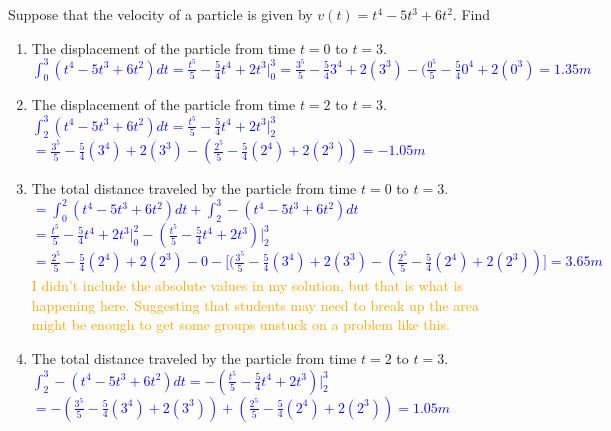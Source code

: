 \documentclass{ximera}
\begin{document}
\begin{exercise}
    Suppose that the velocity of a particle is given by $v(t)=t^4-5t^3+6t^2$.  Find 
    \begin{enumerate}
        \item The displacement of the particle from time $t=0$ to $t=3$.\\
        \textcolor{blue}{ $\int_0^3 (t^4-5t^3+6t^2)dt=\frac{t^5}{5}-\frac{5}{4}t^4+2t^3\bigg|_{0}^{3}=\frac{3^5}{5}-\frac{5}{4}3^4+2(3^3)-(\frac{0^5}{5}-\frac{5}{4}0^4+2(0^3)=1.35 m$}
        
        \item The displacement of the particle from time $t=2$ to $t=3$.\\
        \textcolor{blue}{ $\int_2^3 (t^4-5t^3+6t^2)dt=\frac{t^5}{5}-\frac{5}{4}t^4+2t^3\bigg|_{2}^{3}$\\
        $=\frac{3^5}{5}-\frac{5}{4}(3^4)+2(3^3)-(\frac{2^5}{5}-\frac{5}{4}(2^4)+2(2^3))=-1.05 m$}
        
        \item The total distance traveled by the particle from time $t=0$ to $t=3$.\\
        \textcolor{blue}{ $=\int_0^2 (t^4-5t^3+6t^2)dt+\int_2^3-(t^4-5t^3+6t^2)dt$\\
        $=\frac{t^5}{5}-\frac{5}{4}t^4+2t^3\bigg|_{0}^{2}-(\frac{t^5}{5}-\frac{5}{4}t^4+2t^3)\bigg|_{2}^{3}$\\
        $=\frac{2^5}{5}-\frac{5}{4}(2^4)+2(2^3)-0-\bigg[(\frac{3^5}{5}-\frac{5}{4}(3^4)+2(3^3)-(\frac{2^5}{5}-\frac{5}{4}(2^4)+2(2^3))\bigg]=3.65m$\\}
        \textcolor{orange}{I didn't include the absolute values in my solution, but that is what is happening here.  Suggesting that students may need to break up the area might be enough to get some groups unstuck on a problem like this.}
        \item The total distance traveled by the particle from time $t=2$ to $t=3$.
        \textcolor{blue}{ $\int_2^3 -(t^4-5t^3+6t^2)dt=-(\frac{t^5}{5}-\frac{5}{4}t^4+2t^3)\bigg|_{2}^{3}$\\
        $=-(\frac{3^5}{5}-\frac{5}{4}(3^4)+2(3^3))+(\frac{2^5}{5}-\frac{5}{4}(2^4)+2(2^3))=1.05 m$}
    \end{enumerate}
\end{exercise}
\end{document}
